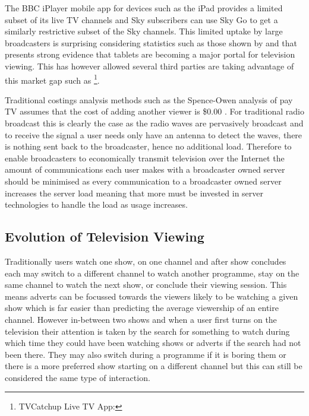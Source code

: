 	The BBC iPlayer mobile app for devices such as the iPad provides a limited subset of its live TV channels and Sky subscribers can use Sky Go to get a similarly restrictive subset of the Sky channels. This limited uptake by large broadcasters is surprising considering statistics such as those shown by \citet{viacom} and that \citep{socialTVPaper} presents strong evidence that tablets are becoming a major portal for television viewing. This has however allowed several third parties are taking advantage of this market gap such as \footnote{TVCatchup Live TV App: }.

Traditional costings analysis methods such as the Spence-Owen analysis of pay TV assumes that the cost of adding another viewer is \$0.00 \citet{broadcastEconomics}. For traditional radio broadcast this is clearly the case as the radio waves are pervasively broadcast and to receive the signal a user needs only have an antenna to detect the waves, there is nothing sent back to the broadcaster, hence no additional load. Therefore to enable broadcasters to economically transmit television over the Internet the amount of communications each user makes with a broadcaster owned server should be minimised as every communication to a broadcaster owned server increases the server load meaning that more must be invested in server technologies to handle the load as usage increases.

\subsection{Evolution of Television Viewing}
Traditionally users watch one show, on one channel and after show concludes each may switch to a different channel to watch another programme, stay on the same channel to watch the next show, or conclude their viewing session. This means adverts can be focussed towards the viewers likely to be watching a given show which is far easier than predicting the average viewership of an entire channel. However in-between two shows and when a user first turns on the television their attention is taken by the search for something to watch during which time they could have been watching shows or adverts if the search had not been there. They may also switch during a programme if it is boring them or there is a more preferred show starting on a different channel but this can still be considered the same type of interaction.

